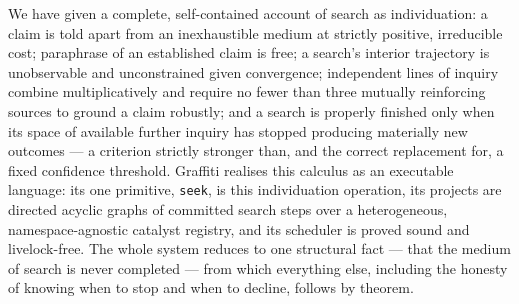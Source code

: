 \documentclass[11pt,twocolumn,a4paper]{article}
\theoremstyle{thmstyle}
\theoremstyle{definition}
\theoremstyle{remark}
\begin{document}
We have given a complete, self-contained account of search as
individuation: a claim is told apart from an inexhaustible medium at
strictly positive, irreducible cost; paraphrase of an established claim is
free; a search's interior trajectory is unobservable and unconstrained
given convergence; independent lines of inquiry combine multiplicatively
and require no fewer than three mutually reinforcing sources to ground a
claim robustly; and a search is properly finished only when its space of
available further inquiry has stopped producing materially new outcomes ---
a criterion strictly stronger than, and the correct replacement for, a
fixed confidence threshold. Graffiti realises this calculus as an
executable language: its one primitive, \texttt{seek}, is this
individuation operation, its projects are directed acyclic graphs of
committed search steps over a heterogeneous, namespace-agnostic catalyst
registry, and its scheduler is proved sound and livelock-free. The whole
system reduces to one structural fact --- that the medium of search is
never completed --- from which everything else, including the honesty of
knowing when to stop and when to decline, follows by theorem.



\end{document}
